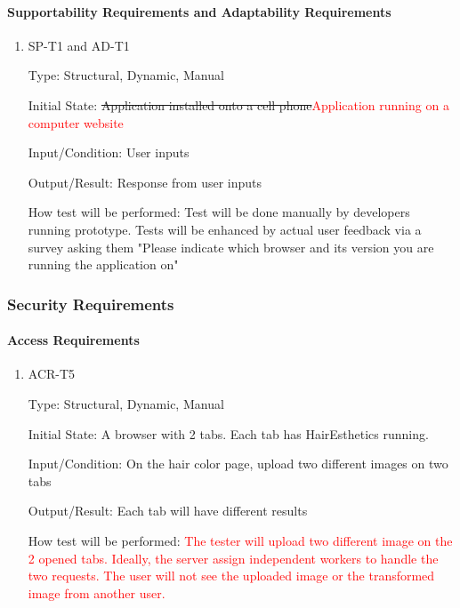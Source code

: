 \documentclass[12pt, titlepage]{article}
\begin{document}
\paragraph{Supportability Requirements and Adaptability Requirements}

\begin{enumerate}

\item{SP-T1 and AD-T1\\}

Type: Structural, Dynamic, Manual
					
Initial State: \sout{Application installed onto a cell phone}\textcolor{red}{Application running on a computer website}
					
Input/Condition: User inputs
					
Output/Result: Response from user inputs
					
How test will be performed: Test will be done manually by developers running prototype. Tests will be enhanced by actual user feedback via a survey asking them "Please indicate which browser and its version you are running the application on"

\end{enumerate}

\subsubsection{Security Requirements}
		
\paragraph{Access Requirements}

\begin{enumerate}

\item{ACR-T5\\}

Type: Structural, Dynamic, Manual
					
Initial State: A browser with 2 tabs. Each tab has HairEsthetics running.
					
Input/Condition: On the hair color page, upload two different images on two tabs
					
Output/Result: Each tab will have different results
					
How test will be performed: \textcolor{red}{The tester will upload two different image on the 2 opened tabs. Ideally, the server assign independent workers to handle the two requests. The user will not see the uploaded image or the transformed image from another user.}

\end{enumerate}
\end{document}
